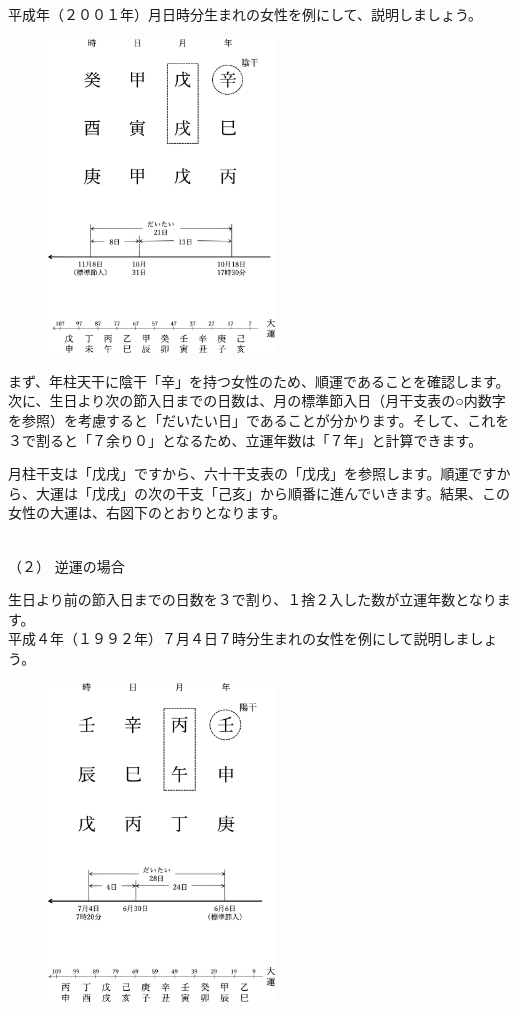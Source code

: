 \documentclass[a5paper,11pt,dvipdfmx]{tarticle}
\begin{document}
平成年（２００１年）月日時分生まれの女性を例にして、説明しましょう。

\begin{figure}[h]
  \includegraphics[width=60mm,angle=90]{figs/figure4-4.eps}
\end{figure}

まず、年柱天干に陰干「辛」を持つ女性のため、順運であることを確認します。次に、生日より次の節入日までの日数は、月の標準節入日（月干支表の○内数字を参照）を考慮すると「だいたい日」であることが分かります。そして、これを３で割ると「７余り０」となるため、立運年数は「７年」と計算できます。

月柱干支は「戊戌」ですから、六十干支表の「戊戌」を参照します。順運ですから、大運は「戊戌」の次の干支「己亥」から順番に進んでいきます。結果、この女性の大運は、右図下のとおりとなります。

\noindent
\\（２） 逆運の場合

生日より前の節入日までの日数を３で割り、１捨２入した数が立運年数となります。\\

平成４年（１９９２年）７月４日７時分生まれの女性を例にして説明しましょう。

\begin{figure}[h]
  \includegraphics[width=60mm,angle=90]{figs/figure4-6.eps}
\end{figure}
\end{document}
